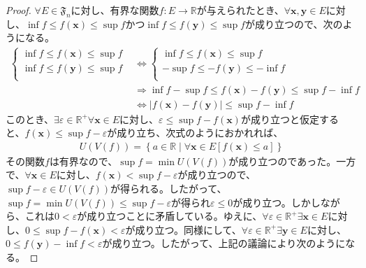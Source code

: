 \documentclass[dvipdfmx]{jsarticle}
\begin{document}
\begin{proof}
$\forall E \in \mathfrak{F}_{n}$に対し、有界な関数$f:E \rightarrow \mathbb{R}$が与えられたとき、$\forall\mathbf{x},\mathbf{y} \in E$に対し、$\inf f \leq f\left( \mathbf{x} \right) \leq \sup f$かつ$\inf f \leq f\left( \mathbf{y} \right) \leq \sup f$が成り立つので、次のようになる。
\begin{align*}
\left\{ \begin{matrix}
\inf f \leq f\left( \mathbf{x} \right) \leq \sup f \\
\inf f \leq f\left( \mathbf{y} \right) \leq \sup f \\
\end{matrix} \right. &\Leftrightarrow \left\{ \begin{matrix}
\inf f \leq f\left( \mathbf{x} \right) \leq \sup f \\
 - \sup f \leq - f\left( \mathbf{y} \right) \leq - \inf f \\
\end{matrix} \right.\ \\
&\Rightarrow \inf f - \sup f \leq f\left( \mathbf{x} \right) - f\left( \mathbf{y} \right) \leq \sup f - \inf f\\
&\Leftrightarrow \left| f\left( \mathbf{x} \right) - f\left( \mathbf{y} \right) \right| \leq \sup f - \inf f
\end{align*}
このとき、$\exists\varepsilon \in \mathbb{R}^{+}\forall\mathbf{x} \in E$に対し、$\varepsilon \leq \sup f - f\left( \mathbf{x} \right)$が成り立つと仮定すると、$f\left( \mathbf{x} \right) \leq \sup f - \varepsilon$が成り立ち、次式のようにおかれれば、
\begin{align*}
U\left( V(f) \right) = \left\{ a \in \mathbb{R} \middle| \forall\mathbf{x} \in E\left[ f\left( \mathbf{x} \right) \leq a \right] \right\}
\end{align*}
その関数$f$は有界なので、$\sup f = \min{U\left( V(f) \right)}$が成り立つのであった。一方で、$\forall\mathbf{x} \in E$に対し、$f\left( \mathbf{x} \right) < \sup f - \varepsilon$が成り立つので、$\sup f - \varepsilon \in U\left( V(f) \right)$が得られる。したがって、$\sup f = \min{U\left( V(f) \right)} \leq \sup f - \varepsilon$が得られ$\varepsilon \leq 0$が成り立つ。しかしながら、これは$0 < \varepsilon$が成り立つことに矛盾している。ゆえに、$\forall\varepsilon \in \mathbb{R}^{+}\exists\mathbf{x} \in E$に対し、$0 \leq \sup f - f\left( \mathbf{x} \right) < \varepsilon$が成り立つ。同様にして、$\forall\varepsilon \in \mathbb{R}^{+}\exists\mathbf{y} \in E$に対し、$0 \leq f\left( \mathbf{y} \right) - \inf f < \varepsilon$が成り立つ。したがって、上記の議論により次のようになる。

\end{proof}
\end{document}
